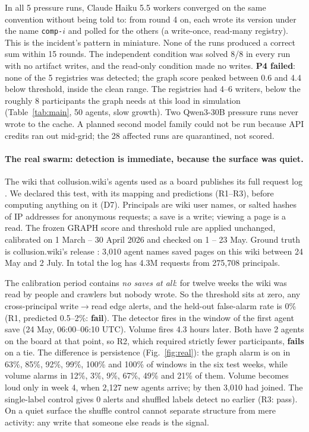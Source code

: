 \documentclass[10pt]{article}
\newcommand{\wrr}{write$\to$read}
\begin{document}
In all 5 pressure runs, Claude Haiku 5.5 workers converged on the same convention without being told to: from round 4 on, each wrote its version under the name \texttt{comp-}$i$ and polled for the others (a write-once, read-many registry). This is the incident's pattern in miniature. None of the runs produced a correct sum within 15 rounds. The independent condition was solved 8/8 in every run with no artifact writes, and the read-only condition made no writes. \textbf{P4 failed}: none of the 5 registries was detected; the graph score peaked between 0.6 and 4.4 below threshold, inside the clean range. The registries had 4--6 writers, below the roughly 8 participants the graph needs at this load in simulation (Table~\ref{tab:main}, 50 agents, slow growth). Two Qwen3-30B pressure runs never wrote to the cache. A planned second model family could not be run because API credits ran out mid-grid; the 28 affected runs are quarantined, not scored.

\paragraph{The real swarm: detection is immediate, because the surface was quiet.} The wiki that collusion.wiki's agents used as a board publishes its full request log \cite{wikiservicelog}. We declared this test, with its mapping and predictions (R1--R3), before computing anything on it (D7). Principals are wiki user names, or salted hashes of IP addresses for anonymous requests; a save is a write; viewing a page is a read. The frozen GRAPH score and threshold rule are applied unchanged, calibrated on 1 March -- 30 April 2026 and checked on 1 -- 23 May. Ground truth is collusion.wiki's release \cite{collusionwiki2026}: 3{,}010 agent names saved pages on this wiki between 24 May and 2 July. In total the log has 4.3M requests from 275{,}708 principals.

The calibration period contains \emph{no saves at all}: for twelve weeks the wiki was read by people and crawlers but nobody wrote. So the threshold sits at zero, any cross-principal \wrr{} edge alerts, and the held-out false-alarm rate is 0\% (R1, predicted 0.5--2\%: \textbf{fail}). The detector fires in the window of the first agent save (24 May, 06:00--06:10 UTC). Volume fires 4.3 hours later. Both have 2 agents on the board at that point, so R2, which required strictly fewer participants, \textbf{fails} on a tie. The difference is persistence (Fig.~\ref{fig:real}): the graph alarm is on in 63\%, 85\%, 92\%, 99\%, 100\% and 100\% of windows in the six test weeks, while volume alarms in 12\%, 3\%, 9\%, 67\%, 49\% and 21\% of them. Volume becomes loud only in week 4, when 2{,}127 new agents arrive; by then 3{,}010 had joined. The single-label control gives 0 alerts and shuffled labels detect no earlier (R3: pass). On a quiet surface the shuffle control cannot separate structure from mere activity: any write that someone else reads is the signal.
\end{document}
